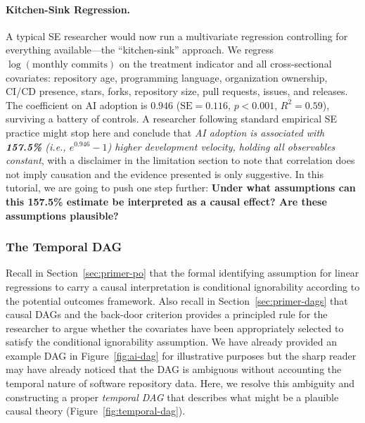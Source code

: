 \paragraph{Kitchen-Sink Regression.}
\label{sec:kitchen-sink}

A typical SE researcher would now run a multivariate regression controlling for everything available---the ``kitchen-sink'' approach.
We regress $\log(\text{monthly commits})$ on the treatment indicator and all cross-sectional covariates: repository age, programming language, organization ownership, CI/CD presence, stars, forks, repository size, pull requests, issues, and releases.
The coefficient on AI adoption is $0.946$ ($\text{SE} = 0.116$, $p < 0.001$, $R^2 = 0.59$), surviving a battery of controls.
A researcher following standard empirical SE practice might stop here and conclude that \emph{AI adoption is associated with \textbf{157.5\%} (i.e., $e^{0.946} - 1$) higher development velocity, holding all observables constant}, with a disclaimer in the limitation section to note that correlation does not imply causation and the evidence presented is only suggestive.
In this tutorial, we are going to push one step further: \textbf{Under what assumptions can this 157.5\% estimate be interpreted as a causal effect? Are these assumptions plausible?}

\subsubsection{The Temporal DAG}
\label{sec:temporal-dag}

Recall in Section~\ref{sec:primer-po} that the formal identifying assumption for linear regressions to carry a causal interpretation is conditional ignorability according to the potential outcomes framework.
Also recall in Section~\ref{sec:primer-dags} that causal DAGs and the back-door criterion provides a principled rule for the researcher to argue whether the covariates have been appropriately selected to satisfy the conditional ignorability assumption.
We have already provided an example DAG in Figure~\ref{fig:ai-dag} for illustrative purposes but the sharp reader may have already noticed that the DAG is ambiguous without accounting the temporal nature of software repository data.
Here, we resolve this ambiguity and constructing a proper \emph{temporal DAG} that describes what might be a plauible causal theory (Figure~\ref{fig:temporal-dag}).

